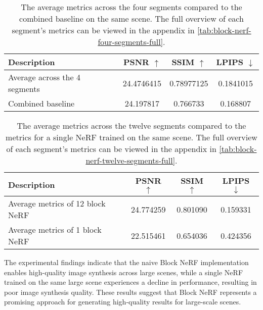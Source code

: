 \begin{table}[ht]
\centering
\setlength{\tabcolsep}{6pt}
\renewcommand{\arraystretch}{1.5}
\begin{tabular}{l | C{2.2} C{1.3} C{1.3}}
\hline
\textbf{Description} & \textbf{PSNR $\uparrow$} & \textbf{SSIM $\uparrow$} & \textbf{LPIPS $\downarrow$} \\
\hline
Average across the 4 segments & 24.4746415 & 0.78977125 & 0.1841015 \\
Combined baseline & 24.197817 & 0.766733 & 0.168807 \\
\hline
\end{tabular}
\caption{The average metrics across the four segments compared to the combined baseline on the same scene. The full overview of each segment's metrics can be viewed in the appendix in \autoref{tab:block-nerf-four-segments-full}.}
\label{tab:exp_combined_baseline_block_nerf}
\end{table}


\begin{table}[ht]
\centering
\setlength{\tabcolsep}{6pt}
\renewcommand{\arraystretch}{1.5}
\begin{tabular}{l | C{2.2} C{1.3} C{1.3}}
\hline
\textbf{Description} & \textbf{PSNR $\uparrow$} & \textbf{SSIM $\uparrow$} & \textbf{LPIPS $\downarrow$} \\
\hline
Average metrics of 12 block NeRF &  24.774259 &  0.801090 &  0.159331 \\
Average metrics of 1 block NeRF &  22.515461 &  0.654036 &  0.424356 \\
\hline
\end{tabular}
\caption{The average metrics across the twelve segments compared to the metrics for a single NeRF trained on the same scene. The full overview of each segment's metrics can be viewed in the appendix in \autoref{tab:block-nerf-twelve-segments-full}.}
\label{tab:exp_block_nerf_long_path_2-block_10}
\end{table}


The experimental findings indicate that the naive Block NeRF implementation enables high-quality image synthesis across large scenes, while a single NeRF trained on the same large scene experiences a decline in performance, resulting in poor image synthesis quality. These results suggest that Block NeRF represents a promising approach for generating high-quality results for large-scale scenes.

